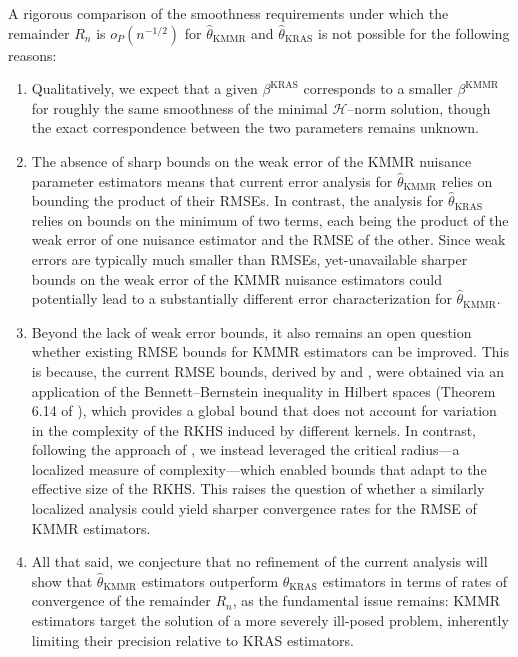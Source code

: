\documentclass[twoside,11pt]{article}
\begin{document}
\begin{itemize}
A rigorous comparison of the smoothness requirements under which the remainder $R_n$ is $o_P(n^{-1/2})$ for $\hat\theta_{\mathrm{KMMR}}$ and $\hat\theta_{\mathrm{KRAS}}$ is not possible for the following reasons: 
\begin{enumerate}
    \item Qualitatively, we expect that a given $\beta^{\mathrm{KRAS}}$ corresponds to a smaller $\beta^{\mathrm{KMMR}}$ for roughly the same smoothness of the minimal $\mathcal{H}$--norm solution, though the exact correspondence between the two parameters remains unknown.

    \item The absence of sharp bounds on the weak error of the KMMR nuisance parameter estimators means that current error analysis for $\hat{\theta}_{\mathrm{KMMR}}$ relies on bounding the product of their RMSEs. In contrast, the analysis for $\hat{\theta}_{\mathrm{KRAS}}$ relies on bounds on the minimum of two terms, each being the product of the weak error of one nuisance estimator and the RMSE of the other. Since weak errors are typically much smaller than RMSEs, yet-unavailable sharper bounds on the weak error of the KMMR nuisance estimators could potentially lead to a substantially different error characterization for $\hat{\theta}_{\mathrm{KMMR}}$. 
    \item Beyond the lack of weak error bounds, it also remains an open question whether existing RMSE bounds for KMMR estimators can be improved. This is because, the current RMSE bounds, derived by \citet{mastouri2021proximal} and \citet{park2024proximal}, were obtained via an application of the Bennett–Bernstein inequality in Hilbert spaces (Theorem 6.14 of \cite{steinwart2008support}), which provides a global bound that does not account for variation in the complexity of the RKHS induced by different kernels. In contrast, following the approach of \citet{bennett2023source}, we instead leveraged the critical radius---a localized measure of complexity---which enabled bounds that adapt to the effective size of the RKHS. This raises the question of whether a similarly localized analysis could yield sharper convergence rates for the RMSE of KMMR estimators.
    
    \item All that said, we conjecture that no refinement of the current analysis will show that $\hat{\theta}_{\mathrm{KMMR}}$ estimators outperform $\hat{\theta}_{\mathrm{KRAS}}$ estimators in terms of rates of convergence of the remainder $R_n$, as the fundamental issue remains: KMMR estimators target the solution of a more severely ill-posed problem, inherently limiting their precision relative to KRAS estimators. 
\end{enumerate}

\end{itemize}
\end{document}

